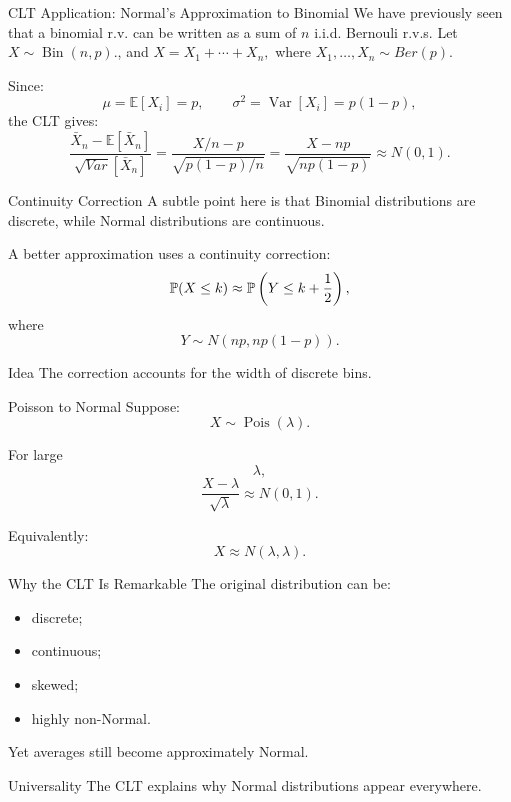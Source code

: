 \begin{frame}{CLT Application: Normal's Approximation to Binomial}
We have previously seen that a binomial r.v. can be written as a sum of $n$ i.i.d. Bernouli r.v.s. Let $X\sim \operatorname{Bin}(n,p).
$, and $X
=
X_1+\cdots+X_n,$ where $X_1,\dots, X_n \sim Ber(p)$.


Since:
\[
\mu=\mathbb{E}[X_i]= p,
\qquad
\sigma^2=\operatorname{Var}[X_i]= p(1-p),
\]
the CLT gives:
\[
\boxed{
\frac{\bar X_n-\mathbb{E}[\bar X_n]}{\sqrt{Var}[\bar X_n]}=\frac{X/n-p}{\sqrt{p(1-p)/n}}
=
\frac{
X-np
}{
\sqrt{np(1-p)}
}
\approx
N(0,1).
}
\]
\end{frame}

\begin{frame}{Continuity Correction}
A subtle point here is that Binomial distributions are discrete, while Normal distributions are continuous.

\vspace{0.25cm}

A better approximation uses a continuity correction:
\[
\mathbb{P}(X\le k)
\approx
\mathbb{P}\left(
Y\le k+\frac12
\right),
\]
where
\[
Y\sim N(np,np(1-p)).
\]

\vspace{0.25cm}

\begin{keybox}{Idea}
The correction accounts for the width of discrete bins.
\end{keybox}
\end{frame}

\begin{frame}{Poisson to Normal}
Suppose:
\[
X\sim \operatorname{Pois}(\lambda).
\]

For large
\[
\lambda,
\]
\[
{
\frac{
X-\lambda
}{
\sqrt{\lambda}
}
\approx
N(0,1).
}
\]

\vspace{0.25cm}

Equivalently:
\[
X
\approx
N(\lambda,\lambda).
\]
\end{frame}

\begin{frame}{Why the CLT Is Remarkable}
The original distribution can be:
\begin{itemize}
    \item discrete;
    \item continuous;
    \item skewed;
    \item highly non-Normal.
\end{itemize}

\vspace{0.25cm}

Yet averages still become approximately Normal.

\vspace{0.25cm}

\begin{keybox}{Universality}
The CLT explains why Normal distributions appear everywhere.
\end{keybox}
\end{frame}


